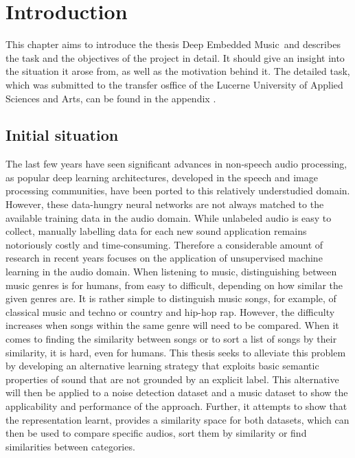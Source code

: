 \chapter{Introduction}
\label{ch:Introduction}
This chapter aims to introduce the thesis \flqq Deep Embedded Music\frqq \ and describes the task and the objectives of the project in detail. It should give an insight into the situation it arose from, as well as the motivation behind it. The detailed task, which was submitted to the transfer osffice of the Lucerne University of Applied Sciences and Arts, can be found in the appendix .

\section{Initial situation}
\label{sub:Initial-Stituation}
The last few years have seen significant advances in non-speech audio processing, as popular deep learning architectures, developed in the speech and image processing communities, have been ported to this relatively understudied domain. However, these data-hungry neural networks are not always matched to the available training data in the audio domain. While unlabeled audio is easy to collect, manually labelling data for each new sound application remains notoriously costly and time-consuming. Therefore a considerable amount of research in recent years focuses on the application of unsupervised machine learning in the audio domain.
\newline
\newline
When listening to music, distinguishing between music genres is for humans, from easy to difficult, depending on how similar the given genres are. It is rather simple to distinguish music songs, for example, of classical music and techno or country and hip-hop rap. However, the difficulty increases when songs within the same genre will need to be compared. When it comes to finding the similarity between songs or to sort a list of songs by their similarity, it is hard, even for humans. 
\newline
\newline
This thesis seeks to alleviate this problem by developing an alternative learning strategy that exploits basic semantic properties of sound that are not grounded by an explicit label. This alternative will then be applied to a noise detection dataset and a music dataset to show the applicability and performance of the approach. Further, it attempts to show that the representation learnt, provides a similarity space for both datasets, which can then be used to compare specific audios, sort them by similarity or find similarities between categories.

